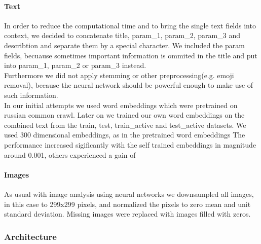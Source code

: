 \documentclass[runningheads]{llncs}
\begin{document}
 \paragraph{Text} In order to reduce the computational time and to bring the single text fields into context, we decided to concatenate title, param\_1, param\_2, param\_3 and  describtion and separate them by a special character. We included the param fields, becuause sometimes important information is ommited in the title and put into param\_1, param\_2 or param\_3 instead.\\
 Furthermore we did not apply stemming or other preprocessing(e.g. emoji removal), because the neural network should be powerful enough to make use of such information.\\
 In our initial attempts we used word embeddings which were pretrained on russian common crawl. Later on we trained our own word embeddings on the combined text from the train, test, train\_active and test\_active datasets. We used 300 dimensional embeddings, as in the pretrained word embeddings %
 The performance increased sigificantly with the self trained embeddings in magnitude around 0.001, others experienced a gain of %
 
 \paragraph{Images} As usual with image analysis using neural networks we downsampled all images, in this case to 299x299 pixels, and normalized the pixels to zero mean and unit standard deviation. Missing images were replaced with images filled with zeros.
 \subsubsection{Architecture}
\end{document}
